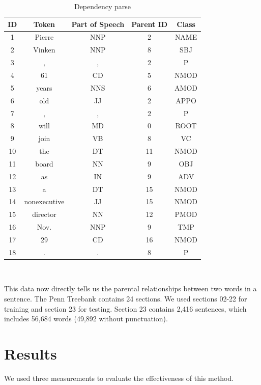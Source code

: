 \documentclass[12pt]{amsart}
\begin{document}
\begin{table}
\label{dependency_parse}
\caption{Dependency parse}
        \begin{tabular}{ccccc}
\hline \hline
            ID & Token & Part of Speech & Parent ID & Class \\ 
            \hline
            1 &Pierre & NNP & 2 & NAME \\
            2 & Vinken & NNP & 8 & SBJ\\
            3 & , & , & 2 & P\\
            4 & 61 & CD & 5 & NMOD\\
            5 & years & NNS & 6 & AMOD\\
            6 & old & JJ & 2 & APPO\\
            7 & , & , & 2 & P\\
            8 & will & MD & 0 & ROOT\\
            9 & join & VB & 8 & VC\\
            10 & the & DT & 11 & NMOD\\
            11 & board & NN & 9 & OBJ\\
            12 & as & IN & 9 & ADV\\
            13 & a & DT & 15 & NMOD\\
            14 & nonexecutive & JJ & 15 & NMOD\\
            15 & director & NN & 12 & PMOD\\
            16 & Nov. & NNP & 9 & TMP\\
            17 & 29 & CD & 16 & NMOD\\
            18 & . & . & 8 & P\\
            \hline
        \end{tabular} \\
\end{table}

This data now directly tells us the parental relationships between two words in a sentence. The Penn Treebank contains 24 sections. We used sections 02-22 for training and section 23 for testing. Section 23 contains 2,416 sentences, which includes 56,684 words (49,892 without punctuation).

\section{Results}
We used three measurements to evaluate the effectiveness of this method.\\
\end{document}
